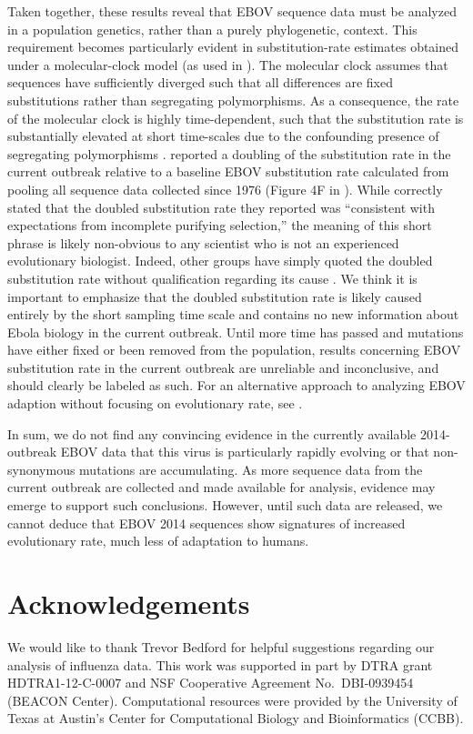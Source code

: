 \documentclass[11pt]{article}
\begin{document}
Taken together, these results reveal that EBOV sequence data must be analyzed in a population genetics, rather than a purely phylogenetic, context. This requirement becomes particularly evident in substitution-rate estimates obtained under a molecular-clock model (as used in \citealt{Gire2014}). The molecular clock assumes that sequences have sufficiently diverged such that all differences are fixed substitutions rather than segregating polymorphisms. As a consequence, the rate of the molecular clock is highly time-dependent, such that the substitution rate is substantially elevated at short time-scales due to the confounding presence of segregating polymorphisms \citep{Hoetal2005, Hoetal2007, PetersonMasel2009, Hoetal2011}. \citet{Gire2014} reported a doubling of the substitution rate in the current outbreak relative to a baseline EBOV substitution rate calculated from pooling all sequence data collected since 1976 (Figure 4F in \citealt{Gire2014}). While \citet{Gire2014} correctly stated that the doubled substitution rate they reported was ``consistent with expectations from incomplete purifying selection,'' the meaning of this short phrase is likely non-obvious to any scientist who is not an experienced evolutionary biologist. Indeed, other groups have simply quoted the doubled substitution rate without qualification regarding its cause \citep{Alexanderetal2014}. We think it is important to emphasize that the doubled substitution rate is likely caused entirely by the short sampling time scale and contains no new information about Ebola biology in the current outbreak. Until more time has passed and mutations have either fixed or been removed from the population, results concerning EBOV substitution rate in the current outbreak are unreliable and inconclusive, and should clearly be labeled as such. For an alternative approach to analyzing EBOV adaption without focusing on evolutionary rate, see \citet{Lukszaetal2014}.

In sum, we do not find any convincing evidence in the currently available 2014-outbreak EBOV data that this virus is particularly rapidly evolving or that non-synonymous mutations are accumulating. As more sequence data from the current outbreak are collected and made available for analysis, evidence may emerge to support such conclusions. However, until such data are released, we cannot deduce that EBOV 2014 sequences show signatures of increased evolutionary rate, much less of adaptation to humans.

\section*{Acknowledgements}
We would like to thank Trevor Bedford for helpful suggestions regarding our analysis of influenza data. This work was supported in part by DTRA grant HDTRA1-12-C-0007 and NSF Cooperative Agreement No.\ DBI-0939454 (BEACON Center). Computational resources were provided by the University of Texas at Austin's Center for Computational Biology and Bioinformatics (CCBB).
\end{document}
